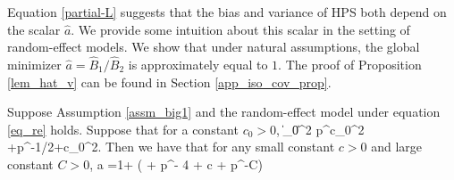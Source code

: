Equation \eqref{partial-L} suggests that the bias and variance of HPS both depend on the scalar $\hat a$.
We provide some intuition about this scalar in the setting of random-effect models.
We show that under natural assumptions, the global minimizer $\hat a = \hat B_1 / \hat B_2$ is approximately equal to $1$.
The proof of Proposition \ref{lem_hat_v} can be found in Section \ref{app_iso_cov_prop}.

\begin{proposition}\label{lem_hat_v}
    Suppose Assumption \ref{assm_big1} and the random-effect model under equation \eqref{eq_re} holds. 
    Suppose that for a constant $c_0>0$,
	\be\label{para_rel}
	    \|\beta_0\|^2 \ge p^{c_0}\mu^2 +p^{-1/2+c_0}\sigma^2.
	\ee
    Then we have that for any small constant $c>0$ and large constant $ C>0$,
	\be\label{hatw_add1}
	 \hat a =1+ \OO\left( + p^{- 4 + c}  + p^{-C}\right) \quad {}
	\ee
\end{proposition}



